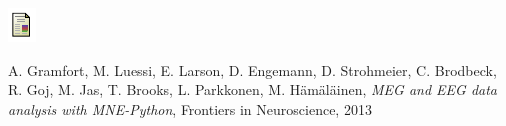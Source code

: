 \documentclass[t,11pt,compress]{beamer} %
\newcommand{\vfillll}{\vfilll\vfilll\vfilll\vfilll\vfilll\vfilll\vfilll\vfilll\vfilll\vfilll\vfilll\vfilll\vfilll\vfilll\vfilll\vfilll\vfilll\vfilll\vfilll\vfilll\vfilll\vfilll\vfilll\vfilll\vfilll\vfilll\vfilll\vfilll\vfilll\vfilll\vfilll\vfilll\vfilll\vfilll\vfilll\vfilll\vfilll\vfilll\vfilll\vfilll}
\begin{document}
\begin{frame}[plain,t,c]
\begin{minipage}{\linewidth}
\begin{minipage}{0.05\linewidth}
    \includegraphics[width=0.9\linewidth]{paper_logo.pdf}%
\end{minipage}
\begin{minipage}{0.93\linewidth}
    A. Gramfort, M. Luessi, E. Larson, D. Engemann, D. Strohmeier, C. Brodbeck, R. Goj, M. Jas, T. Brooks, L. Parkkonen, M. H\"am\"al\"ainen, 
    \emph{MEG and EEG data analysis with MNE-Python}, Frontiers in Neuroscience, 2013
\end{minipage}
\end{minipage}




\end{frame}
\end{document}
